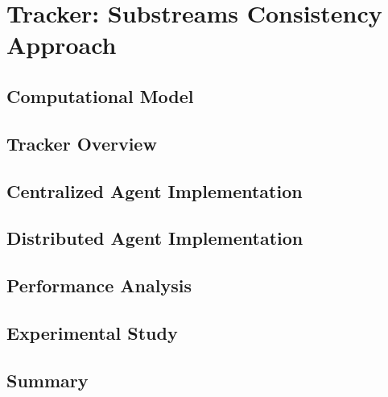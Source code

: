 \chapter{Tracker: Substreams Consistency Approach}
\label{thesis-chapter-tracker}

\section{Computational Model}

\section{Tracker Overview}

\section{Centralized Agent Implementation}

\section{Distributed Agent Implementation}

\section{Performance Analysis}

\section{Experimental Study}

\section{Summary}